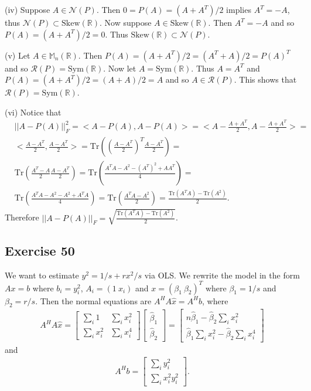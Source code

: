 \documentclass[11.5pt, letterpaper, bibtotoc,
    tablecaptionabove, figurecaptionabove]{article}
\begin{document}
(iv)
Suppose $A\in\mathcal N(P)$. 
Then $0=P(A)=(A+A^T)/2$ implies $A^T=-A$, thus $\mathcal N(P)\subset\text{Skew}(\mathbb R)$.
Now suppose $A\in\text{Skew}(\mathbb R)$.
Then $A^T=-A$ and so $P(A)=(A+A^T)/2=0$. Thus $\text{Skew}(\mathbb R)\subset\mathcal N(P)$.

(v)
Let $A\in\mathbb M_n(\mathbb R)$.
Then $P(A)=(A+A^T)/2=(A^T+A)/2=P(A)^T$ and so $\mathcal R(P)=\text{Sym}(\mathbb R)$.
Now let $A=\text{Sym}(\mathbb R)$.
Thus $A=A^T$ and $P(A)=(A+A^T)/2=(A+A)/2=A$ and so $A\in\mathcal R(P)$.
This shows that $\mathcal R(P)=\text{Sym}(\mathbb R)$.

(vi)
Notice that
\begin{align*}
    &||A - P(A)||_F^2 = <A - P(A), A - P(A)> =
    <A - \frac{A + A^T}{2}, A - \frac{A + A^T}{2}> =\\
    &<\frac{A - A^T}{2}, \frac{A - A^T}{2}> = 
    \text{Tr}\left(\left(\frac{A - A^T}{2}\right)^T\frac{A - A^T}{2}\right)=\\
    &\text{Tr}\left(\frac{A^T - A}{2}\frac{A - A^T}{2}\right) = 
    \text{Tr}\left(\frac{A^TA - A^2 - (A^T)^2 + AA^T}{4}\right) =\\ 
    &\text{Tr}\left(\frac{A^TA - A^2 - A^2 + A^TA}{4}\right) =
    \text{Tr}\left(\frac{A^TA - A^2}{2}\right) = 
    \frac{\text{Tr}(A^TA) - \text{Tr}(A^2)}{2}.
\end{align*}
Therefore $||A - P(A)||_F = \sqrt{\frac{\text{Tr}(A^TA) - \text{Tr}(A^2)}{2}}$.

\subsection*{Exercise 50}
We want to estimate $y^2=1/s+rx^2/s$ via OLS.
We rewrite the model in the form $Ax=b$ where
$b_i=y_i^2$, $A_i=(1\ x_i)$ and $x=(\beta_1\ \beta_2)^T$ where $\beta_1=1/s$ and $\beta_2=r/s$.
Then the normal equations are $A^HA\hat{x}=A^Hb$, where
\begin{align*}
    A^HA\hat{x} =
    \begin{bmatrix}
        \sum_i 1 & \sum_ix_i^2\\
        \sum_ix_i^2& \sum_ix_i^4
    \end{bmatrix} 
    \begin{bmatrix}
        \hat{\beta}_1\\ \hat{\beta}_2
    \end{bmatrix} =
    \begin{bmatrix}
        n\hat{\beta}_1 - \hat{\beta}_2\sum_i x_i^2\\
        \hat{\beta}_1\sum_ix_i^2 - \hat{\beta}_2\sum_ix_i^4
    \end{bmatrix}
\end{align*}
and
\begin{align*}
    A^Hb=
    \begin{bmatrix}
        \sum_i y_i^2\\
        \sum_i x_i^2y_i^2
    \end{bmatrix}.
\end{align*}
\end{document}
